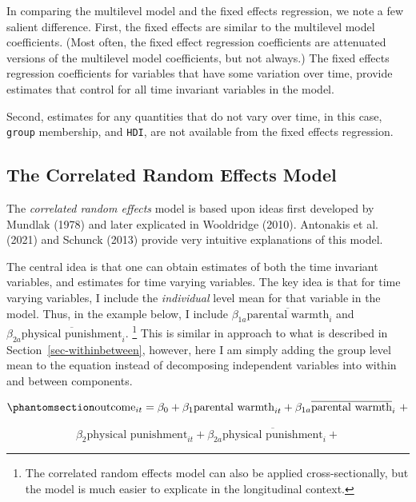 \documentclass[
  letterpaper,
  DIV=11,
  numbers=noendperiod]{scrreprt}
\begin{document}
In comparing the multilevel model and the fixed effects regression, we
note a few salient difference. First, the fixed effects are similar to
the multilevel model coefficients. (Most often, the fixed effect
regression coefficients are attenuated versions of the multilevel model
coefficients, but not always.) The fixed effects regression coefficients
for variables that have some variation over time, provide estimates that
control for all time invariant variables in the model.

Second, estimates for any quantities that do not vary over time, in this
case, \texttt{group} membership, and \texttt{HDI}, are not available
from the fixed effects regression.

\subsection{The Correlated Random Effects
Model}\label{the-correlated-random-effects-model}

The \emph{correlated random effects} model is based upon ideas first
developed by Mundlak (1978) and later explicated in Wooldridge (2010).
Antonakis et al. (2021) and Schunck (2013) provide very intuitive
explanations of this model. 

The central idea is that one can obtain estimates of both the time
invariant variables, and estimates for time varying variables. The key
idea is that for time varying variables, I include the \emph{individual}
level mean for that variable in the model. Thus, in the example below, I
include \(\beta_{1a}\overline{\text{parental warmth}}_{i}\) and
\(\beta_{2a}\overline{\text{physical punishment}}_{i}\). \footnote{The
  correlated random effects model can also be applied cross-sectionally,
  but the model is much easier to explicate in the longitudinal context.}
This is similar in approach to what is described in
Section~\ref{sec-withinbetween}, however, here I am simply adding the
group level mean to the equation instead of decomposing independent
variables into within and between components.

\begin{equation}\phantomsection\label{eq-CRE}{\text{outcome}_{it} = \beta_0 + \beta_1 \text{parental warmth}_{it} + \beta_{1a}\overline{\text{parental warmth}}_{i} \ + }\end{equation}

\[\beta_2 \text{physical punishment}_{it} + \beta_{2a}\overline{\text{physical punishment}}_{i} + \]
\end{document}
